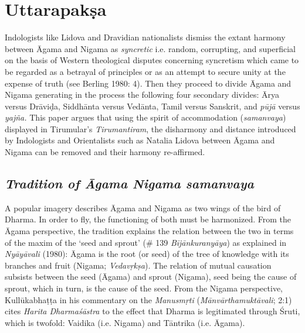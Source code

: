 \section*{Uttarapakṣa}

\vskip -6pt

Indologists like Lidova and Dravidian nationalists dismiss the extant harmony between Āgama and Nigama as \textit{syncretic} i.e. random, corrupting, and superficial on the basis of Western theological disputes concerning syncretism which came to be regarded as a betrayal of principles or as an attempt to secure unity at the expense of truth (see Berling 1980: 4). Then they proceed to divide Āgama and Nigama generating in the process the following four secondary divides: Ārya versus Drāviḍa, Siddhānta versus Vedānta, Tamil versus Sanskrit, and \textit{pūjā} versus \textit{yajña.} This paper argues that using the spirit of accommodation (\textit{samanvaya}) displayed in Tirumular’s \textit{Tirumantiram}, the disharmony and distance introduced by Indologists and Orientalists such as Natalia Lidova between Āgama and Nigama can be removed and their harmony re-affirmed.

\subsection*{\textit{Tradition of Āgama Nigama samanvaya}}

\vskip -6pt

A popular imagery describes Āgama and Nigama as two wings of the bird of Dharma. In order to fly, the functioning of both must be harmonized. From the Āgama perspective, the tradition explains the relation between the two in terms of the maxim of the ‘seed and sprout’ (\# 139 \textit{Bījānkuranyāya}) as explained in \textit{Nyāyāvali} (1980): Āgama is the root (or seed) of the tree of knowledge with its branches and fruit (Nigama; \textit{Vedavṛkṣa}). The relation of mutual causation subsists between the seed (Āgama) and sprout (Nigama), seed being the cause of sprout, which in turn, is the cause of the seed. From the Nigama perspective, Kullūkabhaṭṭa in his commentary on the \textit{Manusmṛti} (\textit{Mānvārthamuktāvali}; 2:1) cites \textit{Harita Dharmaśāstra} to the effect that Dharma is legitimated through Śruti, which is twofold: Vaidika (i.e. Nigama) and Tāntrika (i.e. Āgama).


